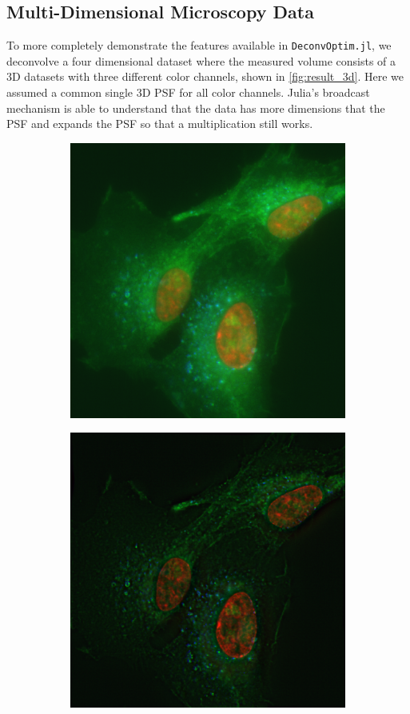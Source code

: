 \documentclass{juliacon}
\begin{document}
    \subsection{Multi-Dimensional Microscopy Data}
        To more completely demonstrate the features available in \verb|DeconvOptim.jl|,
        we deconvolve a four dimensional dataset where the measured volume consists of a 3D datasets
        with three different color channels, shown in \autoref{fig:result_3d}.
        Here we assumed a common single 3D PSF for all color channels.
        Julia's broadcast mechanism is able to understand that 
        the data has more dimensions that the PSF and expands the PSF so that a multiplication still works.
        \begin{figure}[h]
            \begin{subfigure}{.25\textwidth}
                \centering
                \includegraphics[width = .85\textwidth]{figures/raw_rgb.png}
            \end{subfigure}%
            \begin{subfigure}{.25\textwidth}
                \centering
                \includegraphics[width = .85\textwidth]{figures/deconvolved_rgb.png}

\end{subfigure}
\end{figure}
\end{document}
